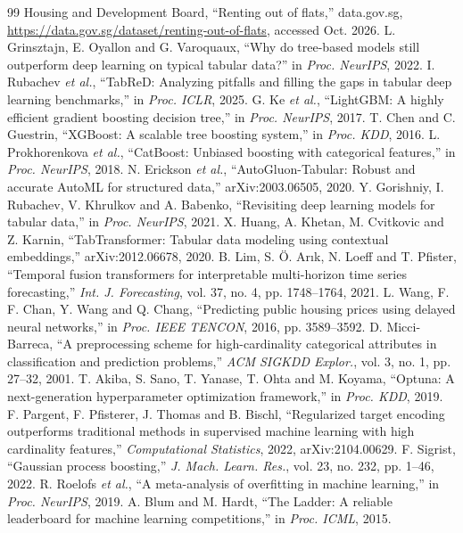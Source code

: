 \documentclass[conference]{IEEEtran}
\begin{document}
\begin{thebibliography}{99}
 Housing and Development Board, ``Renting out of flats,'' data.gov.sg, \url{https://data.gov.sg/dataset/renting-out-of-flats}, accessed Oct. 2026.
 L. Grinsztajn, E. Oyallon and G. Varoquaux, ``Why do tree-based models still outperform deep learning on typical tabular data?'' in \emph{Proc. NeurIPS}, 2022.
 I. Rubachev \emph{et al.}, ``TabReD: Analyzing pitfalls and filling the gaps in tabular deep learning benchmarks,'' in \emph{Proc. ICLR}, 2025.
 G. Ke \emph{et al.}, ``LightGBM: A highly efficient gradient boosting decision tree,'' in \emph{Proc. NeurIPS}, 2017.
 T. Chen and C. Guestrin, ``XGBoost: A scalable tree boosting system,'' in \emph{Proc. KDD}, 2016.
 L. Prokhorenkova \emph{et al.}, ``CatBoost: Unbiased boosting with categorical features,'' in \emph{Proc. NeurIPS}, 2018.
 N. Erickson \emph{et al.}, ``AutoGluon-Tabular: Robust and accurate AutoML for structured data,'' arXiv:2003.06505, 2020.
 Y. Gorishniy, I. Rubachev, V. Khrulkov and A. Babenko, ``Revisiting deep learning models for tabular data,'' in \emph{Proc. NeurIPS}, 2021.
 X. Huang, A. Khetan, M. Cvitkovic and Z. Karnin, ``TabTransformer: Tabular data modeling using contextual embeddings,'' arXiv:2012.06678, 2020.
 B. Lim, S. {\"O}. Ar{\i}k, N. Loeff and T. Pfister, ``Temporal fusion transformers for interpretable multi-horizon time series forecasting,'' \emph{Int. J. Forecasting}, vol. 37, no. 4, pp. 1748--1764, 2021.
 L. Wang, F. F. Chan, Y. Wang and Q. Chang, ``Predicting public housing prices using delayed neural networks,'' in \emph{Proc. IEEE TENCON}, 2016, pp. 3589--3592.
 D. Micci-Barreca, ``A preprocessing scheme for high-cardinality categorical attributes in classification and prediction problems,'' \emph{ACM SIGKDD Explor.}, vol. 3, no. 1, pp. 27--32, 2001.
 T. Akiba, S. Sano, T. Yanase, T. Ohta and M. Koyama, ``Optuna: A next-generation hyperparameter optimization framework,'' in \emph{Proc. KDD}, 2019.
 F. Pargent, F. Pfisterer, J. Thomas and B. Bischl, ``Regularized target encoding outperforms traditional methods in supervised machine learning with high cardinality features,'' \emph{Computational Statistics}, 2022, arXiv:2104.00629.
 F. Sigrist, ``Gaussian process boosting,'' \emph{J. Mach. Learn. Res.}, vol. 23, no. 232, pp. 1--46, 2022.
 R. Roelofs \emph{et al.}, ``A meta-analysis of overfitting in machine learning,'' in \emph{Proc. NeurIPS}, 2019.
 A. Blum and M. Hardt, ``The Ladder: A reliable leaderboard for machine learning competitions,'' in \emph{Proc. ICML}, 2015.
\end{thebibliography}
\end{document}
